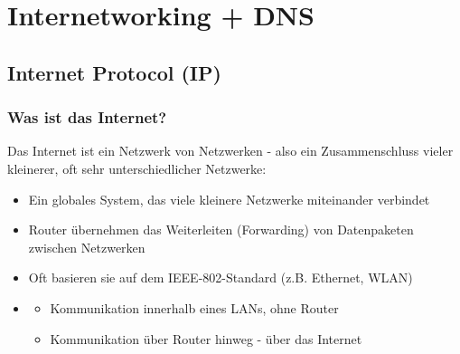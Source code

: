 \section{Internetworking + DNS}
\subsection{Internet Protocol (IP)}
\subsubsection*{Was ist das Internet?}
Das Internet ist ein Netzwerk von Netzwerken - also ein Zusammenschluss vieler kleinerer, oft sehr unterschiedlicher Netzwerke:
\begin{itemize}
    \item {} Ein globales System, das viele kleinere Netzwerke miteinander verbindet
    \item {} Router übernehmen das Weiterleiten (Forwarding) von Datenpaketen zwischen Netzwerken
    \item {} Oft basieren sie auf dem IEEE-802-Standard (z.B. Ethernet, WLAN)
    \item {}
    \begin{itemize}
        \item {} Kommunikation innerhalb eines LANs, ohne Router
        \item {} Kommunikation über Router hinweg - über das Internet
    \end{itemize}
\end{itemize}
